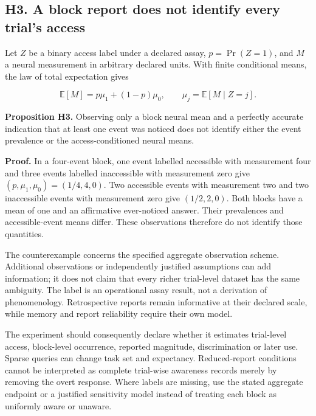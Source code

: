 \documentclass[
  american,
  11pt,
  letterpaper,
]{article}
\begin{document}
\subsection{H3. A block report does not identify every trial's access}\label{h3.-a-block-report-does-not-identify-every-trials-access}

Let \(Z\) be a binary access label under a declared assay, \(p=\Pr(Z=1)\), and \(M\) a neural measurement in arbitrary declared units. With finite conditional means, the law of total expectation gives

\begin{equation}
\mathbb E[M]=p\mu_1+(1-p)\mu_0,\qquad
\mu_j=\mathbb E[M\mid Z=j].
\tag{H5}
\end{equation}

\textbf{Proposition H3.} Observing only a block neural mean and a perfectly accurate indication that at least one event was noticed does not identify either the event prevalence or the access-conditioned neural means.

\textbf{Proof.} In a four-event block, one event labelled accessible with measurement four and three events labelled inaccessible with measurement zero give \((p,\mu_1,\mu_0)=(1/4,4,0)\). Two accessible events with measurement two and two inaccessible events with measurement zero give \((1/2,2,0)\). Both blocks have a mean of one and an affirmative ever-noticed answer. Their prevalences and accessible-event means differ. These observations therefore do not identify those quantities.

The counterexample concerns the specified aggregate observation scheme. Additional observations or independently justified assumptions can add information; it does not claim that every richer trial-level dataset has the same ambiguity. The label is an operational assay result, not a derivation of phenomenology. Retrospective reports remain informative at their declared scale, while memory and report reliability require their own model.

The experiment should consequently declare whether it estimates trial-level access, block-level occurrence, reported magnitude, discrimination or later use. Sparse queries can change task set and expectancy. Reduced-report conditions cannot be interpreted as complete trial-wise awareness records merely by removing the overt response. Where labels are missing, use the stated aggregate endpoint or a justified sensitivity model instead of treating each block as uniformly aware or unaware.
\end{document}
